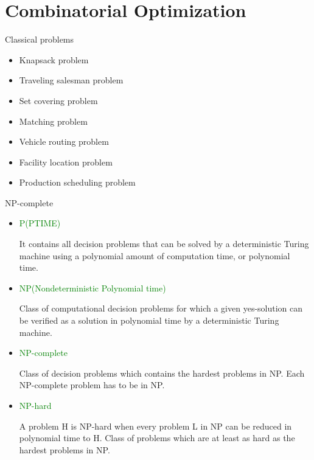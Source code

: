 \section{Combinatorial Optimization}

    \frame{\sectionpage}

    \begin{frame}{Classical problems}
      \large
      \begin{spacing}{1.5}
      \begin{itemize}
        \item Knapsack problem
        \item Traveling salesman problem
        \item Set covering problem
        \item Matching problem
        \item Vehicle routing problem
        \item Facility location problem
        \item Production scheduling problem
      \end{itemize}
      \end{spacing}
   \end{frame}

   \begin{frame}{NP-complete}
     \begin{itemize}
       \item \textcolor{green}{P(PTIME)}

       It contains all decision problems that can be solved by a deterministic Turing machine using a polynomial amount of computation time, or polynomial time.
       \item \textcolor{green}{NP(Nondeterministic Polynomial time)}

       Class of computational decision problems for which a given yes-solution can be verified as a solution in polynomial time by a deterministic Turing machine.
       \item \textcolor{green}{NP-complete}

       Class of decision problems which contains the hardest problems in NP. Each NP-complete problem has to be in NP.
       \item \textcolor{green}{NP-hard}

       A problem H is NP-hard when every problem L in NP can be reduced in polynomial time to H.
       Class of problems which are at least as hard as the hardest problems in NP.
     \end{itemize}

   \end{frame}

